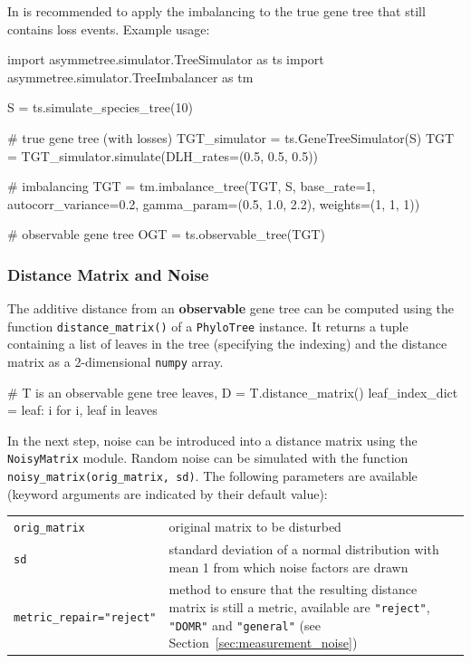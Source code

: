\documentclass[hidelinks,11pt]{article}
\begin{document}
In is recommended to apply the imbalancing to the true gene tree that still contains loss events.
Example usage:
\vspace{2mm}
\begin{python}
import asymmetree.simulator.TreeSimulator as ts
import asymmetree.simulator.TreeImbalancer as tm

S = ts.simulate_species_tree(10)

# true gene tree (with losses)
TGT_simulator = ts.GeneTreeSimulator(S)
TGT = TGT_simulator.simulate(DLH_rates=(0.5, 0.5, 0.5))

# imbalancing
TGT = tm.imbalance_tree(TGT, S, base_rate=1,
                        autocorr_variance=0.2,
                        gamma_param=(0.5, 1.0, 2.2),
                        weights=(1, 1, 1))

# observable gene tree
OGT = ts.observable_tree(TGT)
\end{python}
\vspace{2mm}


\subsubsection{Distance Matrix and Noise}

The additive distance from an \textbf{observable} gene tree can be computed using the function \texttt{distance\_matrix()} of a \texttt{PhyloTree} instance.
It returns a tuple containing a list of leaves in the tree (specifying the indexing) and the distance matrix as a 2-dimensional \texttt{numpy} array.

\vspace{2mm}
\begin{python}
# T is an observable gene tree
leaves, D = T.distance_matrix()
leaf_index_dict = {leaf: i for i, leaf in leaves}
\end{python}
\vspace{2mm}

In the next step, noise can be introduced into a distance matrix using the \texttt{NoisyMatrix} module.
Random noise can be simulated with the function \texttt{noisy\_matrix(orig\_matrix, sd)}.
The following parameters are available (keyword arguments are indicated by their default value):

\vspace{3mm}
\renewcommand{\arraystretch}{1.5}
\begin{tabularx}{0.95\textwidth} { >{\raggedright\arraybackslash}p{4.5cm} >{\raggedright\arraybackslash}X }
	\texttt{orig\_matrix} & original matrix to be disturbed\\
	\texttt{sd}  & standard deviation of a normal distribution with mean 1 from which noise factors are drawn\\
	\texttt{metric\_repair="reject"}  & method to ensure that the resulting distance matrix is still a metric, available are \texttt{"reject"}, \texttt{"DOMR"} and \texttt{"general"} (see Section~\ref{sec:measurement_noise})\\
\end{tabularx}
\vspace{3mm}
\end{document}
